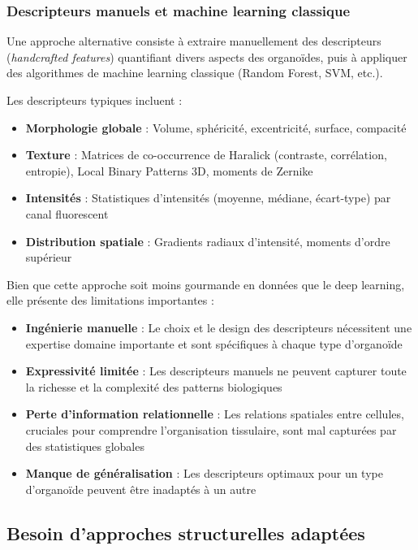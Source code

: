 \subsubsection{Descripteurs manuels et machine learning classique}

Une approche alternative consiste à extraire manuellement des descripteurs (\textit{handcrafted features}) quantifiant divers aspects des organoïdes, puis à appliquer des algorithmes de machine learning classique (Random Forest, SVM, etc.).

Les descripteurs typiques incluent :
\begin{itemize}
    \item \textbf{Morphologie globale} : Volume, sphéricité, excentricité, surface, compacité
    \item \textbf{Texture} : Matrices de co-occurrence de Haralick (contraste, corrélation, entropie), Local Binary Patterns 3D, moments de Zernike
    \item \textbf{Intensités} : Statistiques d'intensités (moyenne, médiane, écart-type) par canal fluorescent
    \item \textbf{Distribution spatiale} : Gradients radiaux d'intensité, moments d'ordre supérieur
\end{itemize}

Bien que cette approche soit moins gourmande en données que le deep learning, elle présente des limitations importantes :
\begin{itemize}
    \item \textbf{Ingénierie manuelle} : Le choix et le design des descripteurs nécessitent une expertise domaine importante et sont spécifiques à chaque type d'organoïde
    \item \textbf{Expressivité limitée} : Les descripteurs manuels ne peuvent capturer toute la richesse et la complexité des patterns biologiques
    \item \textbf{Perte d'information relationnelle} : Les relations spatiales entre cellules, cruciales pour comprendre l'organisation tissulaire, sont mal capturées par des statistiques globales
    \item \textbf{Manque de généralisation} : Les descripteurs optimaux pour un type d'organoïde peuvent être inadaptés à un autre
\end{itemize}

\subsection{Besoin d'approches structurelles adaptées}


